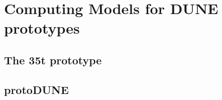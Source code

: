 \section{Computing Models for DUNE prototypes}
\subsection{The 35t prototype}

\newpage
\subsection{protoDUNE}



\newpage


